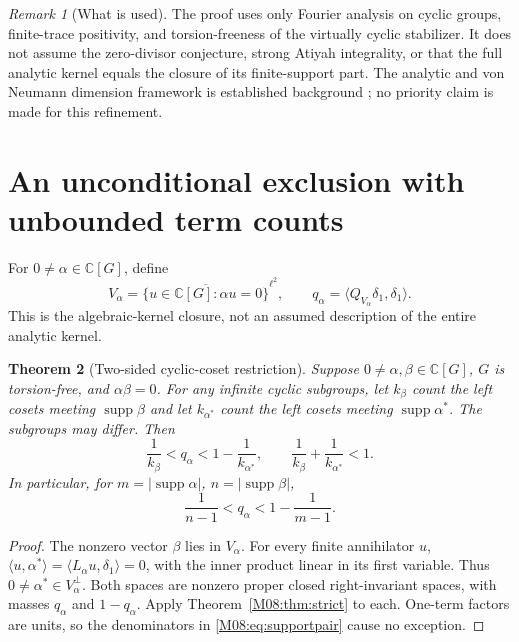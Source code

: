\documentclass[11pt,a4paper,oneside]{report}
\newtheorem{theorem}{Theorem}[section]
\theoremstyle{definition}
\theoremstyle{remark}
\newtheorem{remark}[theorem]{Remark}
\DeclareMathOperator{\supp}{supp}
\newcommand{\C}{\mathbb C}
\begin{document}
\begin{remark}[What is used]
The proof uses only Fourier analysis on cyclic groups, finite-trace
positivity, and torsion-freeness of the virtually cyclic stabilizer.
It does not assume the zero-divisor conjecture, strong Atiyah
integrality, or that the full analytic kernel equals the closure
of its finite-support part. The analytic and von Neumann dimension
framework is established background \cite{B:Linnell}; no priority claim
is made for this refinement.
\end{remark}

\section{An unconditional exclusion with unbounded term counts}

For $0\ne\alpha\in\C[G]$, define
\[
V_\alpha=
\overline{\{u\in\C[G]:\alpha u=0\}}^{\ell^2},
\qquad q_\alpha=\langle Q_{V_\alpha}\delta_1,\delta_1\rangle.
\]
This is the algebraic-kernel closure, not an assumed description
of the entire analytic kernel.

\begin{theorem}[Two-sided cyclic-coset restriction]\label{M08:thm:product}
Suppose $0\ne\alpha,\beta\in\C[G]$, $G$ is torsion-free,
and $\alpha\beta=0$. For any infinite cyclic subgroups,
let $k_\beta$ count the left cosets meeting $\supp\beta$ and
let $k_{\alpha^*}$ count the left cosets meeting $\supp\alpha^*$.
The subgroups may differ. Then
\begin{equation}\label{M08:eq:twosided}
\boxed{\frac1{k_\beta}<q_\alpha<1-\frac1{k_{\alpha^*}},
\qquad\frac1{k_\beta}+\frac1{k_{\alpha^*}}<1.}
\end{equation}
In particular, for $m=|\supp\alpha|$, $n=|\supp\beta|$,
\begin{equation}\label{M08:eq:supportpair}
\boxed{\frac1{n-1}<q_\alpha<1-\frac1{m-1}.}
\end{equation}
\end{theorem}
\begin{proof}
The nonzero vector $\beta$ lies in $V_\alpha$. For every finite
annihilator $u$,
$\langle u,\alpha^*\rangle=\langle L_\alpha u,\delta_1\rangle=0$,
with the inner product linear in its first variable.
Thus $0\ne\alpha^*\in V_\alpha^\perp$.
Both spaces are nonzero proper closed right-invariant spaces,
with masses $q_\alpha$ and $1-q_\alpha$. Apply
Theorem~\ref{M08:thm:strict} to each. One-term factors are units,
so the denominators in \eqref{M08:eq:supportpair} cause no exception.
\end{proof}
\end{document}
